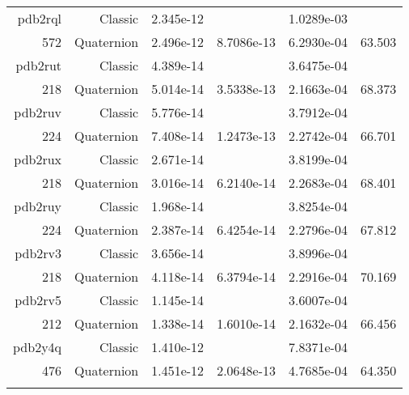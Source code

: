 \begin{xltabular}{\textwidth}{r|rS[table-format=1.3e+2]S[table-format=1.4e+2]S[table-format=1.4e+2]S[table-format=-1.3]}
pdb2rql & Classic & 2.345e-12 &  & 1.0289e-03 & \\
572 & Quaternion & 2.496e-12 & 8.7086e-13 & 6.2930e-04 & 63.503\\  \addlinespace
pdb2rut & Classic & 4.389e-14 &  & 3.6475e-04 & \\
218 & Quaternion & 5.014e-14 & 3.5338e-13 & 2.1663e-04 & 68.373\\  \addlinespace
pdb2ruv & Classic & 5.776e-14 &  & 3.7912e-04 & \\
224 & Quaternion & 7.408e-14 & 1.2473e-13 & 2.2742e-04 & 66.701\\  \addlinespace
pdb2rux & Classic & 2.671e-14 &  & 3.8199e-04 & \\
218 & Quaternion & 3.016e-14 & 6.2140e-14 & 2.2683e-04 & 68.401\\  \addlinespace
pdb2ruy & Classic & 1.968e-14 &  & 3.8254e-04 & \\
224 & Quaternion & 2.387e-14 & 6.4254e-14 & 2.2796e-04 & 67.812\\  \addlinespace
pdb2rv3 & Classic & 3.656e-14 &  & 3.8996e-04 & \\
218 & Quaternion & 4.118e-14 & 6.3794e-14 & 2.2916e-04 & 70.169\\  \addlinespace
pdb2rv5 & Classic & 1.145e-14 &  & 3.6007e-04 & \\
212 & Quaternion & 1.338e-14 & 1.6010e-14 & 2.1632e-04 & 66.456\\  \addlinespace
pdb2y4q & Classic & 1.410e-12 &  & 7.8371e-04 & \\
476 & Quaternion & 1.451e-12 & 2.0648e-13 & 4.7685e-04 & 64.350\\  \addlinespace
\end{xltabular}
